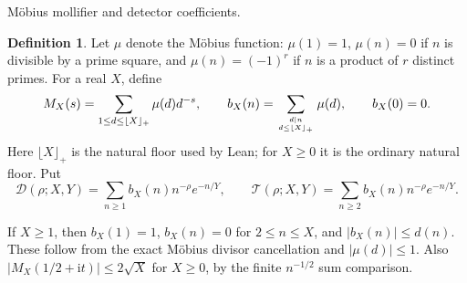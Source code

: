 \documentclass[11pt,a4paper]{article}
\numberwithin{equation}{section}
\theoremstyle{definition}
\newtheorem{definition}[theorem]{Definition}
\newcommand{\ii}{\mathrm i}
\begin{document}
\par\medskip\noindent M\"obius mollifier and detector coefficients.
\begin{definition}
Let $\mu$ denote the M\"obius function: $\mu(1)=1$, $\mu(n)=0$ if $n$
is divisible by a prime square, and $\mu(n)=(-1)^r$ if $n$ is a product
of $r$ distinct primes. For a real $X$, define
\[
 M_X(s)=\sum_{1\le d\le\lfloor X\rfloor_+}\mu(d)d^{-s},\qquad
 b_X(n)=\sum_{d\mid n\atop d\le\lfloor X\rfloor_+}\mu(d),\qquad b_X(0)=0.
\]
Here $\lfloor X\rfloor_+$ is the natural floor used by Lean; for $X\ge0$
it is the ordinary natural floor. Put
\[
 \mathcal D(\rho;X,Y)=\sum_{n\ge1}b_X(n)n^{-\rho}e^{-n/Y},\qquad
 \mathcal T(\rho;X,Y)=\sum_{n\ge2}b_X(n)n^{-\rho}e^{-n/Y}.
\]
\end{definition}
If $X\ge1$, then $b_X(1)=1$, $b_X(n)=0$ for $2\le n\le X$,
and $|b_X(n)|\le d(n)$. These follow from the exact M\"obius divisor
cancellation and $|\mu(d)|\le1$. Also
$|M_X(1/2+\ii t)|\le2\sqrt X$ for $X\ge0$, by the finite
$n^{-1/2}$ sum comparison.
\end{document}
